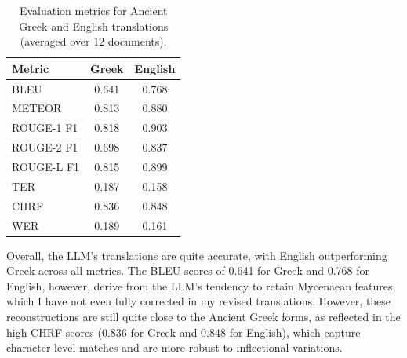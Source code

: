 \begin{table}[H]
\centering
\caption{Evaluation metrics for Ancient Greek and English translations (averaged over 12 documents).}
\label{tab:metrics-combined}
\begin{tabular}{|l|c|c|}
\hline
Metric & Greek & English \\
\hline
BLEU        & 0.641 & 0.768 \\
METEOR      & 0.813 & 0.880 \\
ROUGE-1 F1  & 0.818 & 0.903 \\
ROUGE-2 F1  & 0.698 & 0.837 \\
ROUGE-L F1  & 0.815 & 0.899 \\
TER         & 0.187 & 0.158 \\
CHRF        & 0.836 & 0.848 \\
WER         & 0.189 & 0.161 \\
\hline
\end{tabular}
\end{table}

Overall, the LLM's translations are quite accurate, with English outperforming Greek across all metrics.
The BLEU scores of 0.641 for Greek and 0.768 for English, however, derive from the LLM's tendency to retain Mycenaean features, which I have not even fully corrected in my revised translations.
However, these reconstructions are still quite close to the Ancient Greek forms, as reflected in the high CHRF scores (0.836 for Greek and 0.848 for English), which capture character-level matches and are more robust to inflectional variations.